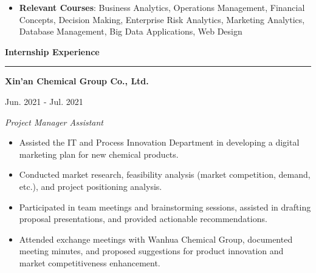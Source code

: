\documentclass[
  16,
]{article}
\providecommand{\tightlist}{%
  \setlength{\itemsep}{0pt}\setlength{\parskip}{0pt}}\usepackage{longtable,booktabs,array}
\begin{document}
\begin{itemize}
\tightlist
\item
  \textbf{Relevant Courses}: Business Analytics, Operations Management,
  Financial Concepts, Decision Making, Enterprise Risk Analytics,
  Marketing Analytics, Database Management, Big Data Applications, Web
  Design
\end{itemize}

\vspace{2pt}

\begin{large}{\bf Internship Experience}
  \vspace{3pt}
  \hrule
  \begin{multicols}{2}
  \parbox{1.4\linewidth}{\bf Xin'an Chemical Group Co., Ltd.}
    \begin{flushright}Jun. 2021 - Jul. 2021\end{flushright}
  \end{multicols}
  \vspace{-0.17cm}
  \begin{multicols}{2}
    \begin{flushleft}\textit{Project Manager Assistant}\end{flushleft}
    \begin{flushright}  \end{flushright}\end
  {multicols}
\end{large}
\vspace{-0.16cm}

\begin{itemize}
\tightlist
\item
  Assisted the IT and Process Innovation Department in developing a
  digital marketing plan for new chemical products.
\item
  Conducted market research, feasibility analysis (market competition,
  demand, etc.), and project positioning analysis.
\item
  Participated in team meetings and brainstorming sessions, assisted in
  drafting proposal presentations, and provided actionable
  recommendations.
\item
  Attended exchange meetings with Wanhua Chemical Group, documented
  meeting minutes, and proposed suggestions for product innovation and
  market competitiveness enhancement.
\end{itemize}

\vspace{7pt}
\end{document}
